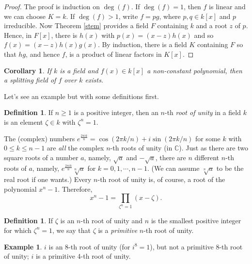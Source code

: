 \documentclass[12pt]{report}
\newtheorem{cor}[thm]{Corollary}
\theoremstyle{definition}
\newtheorem{defn}[thm]{Definition}
\newtheorem{example}[thm]{Example}
\def\CC{\mathbb{C}}
\begin{document}
\begin{proof}
    The proof is induction on $\deg(f)$. If $\deg(f)=1$, then $f$ is linear and we can choose $K=k$. If $\deg(f) > 1$, write $f=pg$, where $p,q\in k[x]$ and $p$ irreducible. Now Theorem \ref{stem} provides a field $F$ containing $k$ and a root $z$ of $p$. Hence, in $F[x]$, there is $h(x)$ with $p(x)=(x-z)h(x)$ and so $f(x)=(x-z)h(x)g(x)$. By induction, there is a field $K$ containing $F$ so that $hg$, and hence $f$, is a product of linear factors in $K[x]$. 
\end{proof}

\begin{cor}
    If $k$ is a field and $f(x)\in k[x]$ a non-constant polynomial, then a splitting field of $f$ over $k$ exists.
\end{cor}

Let's see an example but with some definitions first.

\begin{defn}
    If $n \geq  1$ is a positive integer, then an $n$-th \emph{root of unity} in a field $k$ is an element $\zeta \in  k$ with $\zeta^n = 1$.
\end{defn}


The (complex) numbers $e^{\frac{2\pi i k}{n}} = \cos(2\pi k/n) + i \sin(2\pi k/n)$ for some $k$ with $0 \leq  k \leq  n- 1$ are \emph{all} the complex $n$-th roots of unity (in $\CC$). Just as there are two square roots of a number $a$, namely, $\sqrt{a}$ and $-\sqrt{a}$, there are $n$ different $n$-th roots of $a$, namely, $e^{\frac{2\pi i k}{n}}\sqrt[n]{a}$  for $k = 0, 1,\cdots , n - 1$. (We can assume $\sqrt[n]{a}$ to be the real root if one wants.) Every $n$-th root of unity is, of course, a root of the polynomial $x^n- 1$. Therefore, \begin{equation}\label{cycoeq1}
    x^n - 1 = \prod_{\zeta^n=1}(x -\zeta).
\end{equation}


\begin{defn}
    If $\zeta$ is an $n$-th root of unity and $n$ is the smallest positive integer for which $\zeta^n = 1$, we say that $\zeta$ is a \emph{primitive} $n$-th root of unity.
\end{defn}

\begin{example}
    $i$ is an 8-th root of unity (for $i^8 = 1$), but not a primitive 8-th root of unity; $i$ is a primitive 4-th root of unity.
\end{example}
\end{document}
